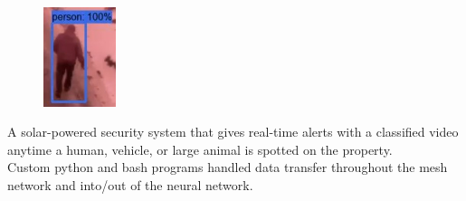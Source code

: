 \documentclass[
	10pt, %
]{FreemanCV}
\begin{document}
\begin{paracol}{2}
\setlength\intextsep{0pt} %
\begin{figure} %
	\hspace*{-5pt} %
    \includegraphics[width=60pt]{security_system} %
\end{figure}

A solar-powered security system that gives real-time alerts with a classified video anytime a human, vehicle, or large animal is spotted
on the property.\\

Custom python and bash programs handled data transfer throughout the mesh network and into/out of the neural network.


\end{paracol}





	


\end{document}
